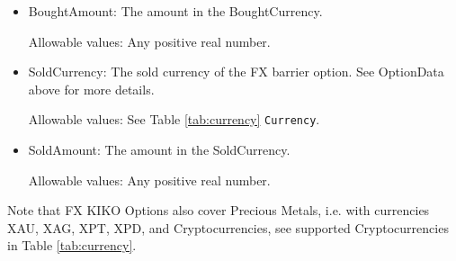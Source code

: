 \begin{itemize}
\item BoughtAmount: The amount in the BoughtCurrency.  

Allowable values:  Any positive real number.

\item SoldCurrency: The sold currency of the FX barrier option. See OptionData above for more details.

Allowable values:  See Table \ref{tab:currency} \lstinline!Currency!.

\item SoldAmount: The amount in the SoldCurrency.  

Allowable values:  Any positive real number.

\end{itemize}

Note that FX KIKO Options also cover Precious Metals, i.e. with
currencies XAU, XAG, XPT, XPD, and Cryptocurrencies,  see supported Cryptocurrencies in Table \ref{tab:currency}.